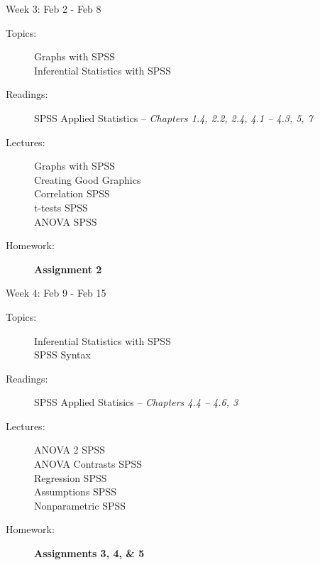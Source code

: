 \documentclass[11pt,article,oneside]{memoir}
\newcounter{schedule}
\begin{document}
\begin{schedule}{Week 3: Feb 2 - Feb 8}
\begin{description}
\item[Topics:] Graphs with SPSS \\ Inferential Statistics with SPSS

\item[Readings:] SPSS Applied Statistics -- \textit{Chapters 1.4, 2.2, 2.4, 4.1 -- 4.3, 5, 7}

\item[Lectures:] Graphs with SPSS \\ Creating Good Graphics \\ Correlation SPSS \\ t-tests SPSS \\ ANOVA SPSS 

\item[Homework:] \textbf{Assignment 2} 

\end{description}
\end{schedule}
\begin{schedule}{Week 4: Feb 9 - Feb 15}
\begin{description}
\item[Topics:] Inferential Statistics with SPSS \\ SPSS Syntax

\item[Readings:] SPSS Applied Statisics -- \textit{Chapters 4.4 -- 4.6, 3}

\item[Lectures:] ANOVA 2 SPSS \\ ANOVA Contrasts SPSS \\ Regression SPSS \\  Assumptions SPSS \\ Nonparametric SPSS

\item[Homework:] \textbf{Assignments 3, 4, \& 5}

\end{description}
\end{schedule}
\end{document}
